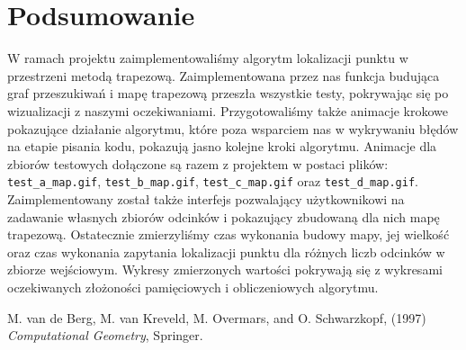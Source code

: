 \documentclass[11pt,a4paper]{article}
\begin{document}
\section{Podsumowanie}
W ramach projektu zaimplementowaliśmy algorytm lokalizacji
punktu w przestrzeni metodą trapezową. Zaimplementowana przez
nas funkcja budująca graf przeszukiwań i mapę trapezową przeszła
wszystkie testy, pokrywając się po wizualizacji z naszymi oczekiwaniami.
Przygotowaliśmy także animacje krokowe pokazujące działanie algorytmu,
które poza wsparciem nas w wykrywaniu błędów na etapie pisania kodu,
pokazują jasno kolejne kroki algorytmu. Animacje dla zbiorów testowych dołączone 
są razem z projektem w postaci plików: \verb|test_a_map.gif|, 
\verb|test_b_map.gif|, \verb|test_c_map.gif| oraz \verb|test_d_map.gif|.
Zaimplementowany został także interfejs pozwalający użytkownikowi na
zadawanie własnych zbiorów odcinków i pokazujący zbudowaną dla nich
mapę trapezową. Ostatecznie zmierzyliśmy czas wykonania budowy mapy,
jej wielkość oraz czas wykonania zapytania lokalizacji punktu dla różnych
liczb odcinków w zbiorze wejściowym. Wykresy zmierzonych wartości
pokrywają się z wykresami oczekiwanych złożoności pamięciowych i obliczeniowych
algorytmu.

\begin{thebibliography}{999}
    M. van de Berg, M. van Kreveld, M. Overmars, and O. Schwarzkopf,
    (1997)
    \emph{Computational Geometry},
    Springer.
\end{thebibliography}
\end{document}
